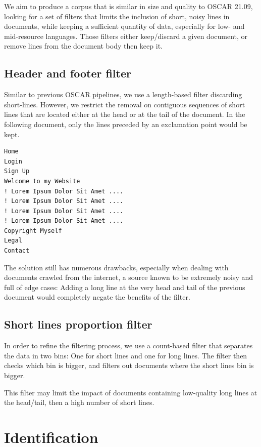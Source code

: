 We aim to produce a corpus that is similar in size and quality to OSCAR 21.09, looking for a set of filters that limits the inclusion of short, noisy lines in documents, while keeping a sufficient quantity of data, especially for low- and mid-resource languages. Those filters either keep/discard a given document, or remove lines from the document body then keep it.

\subsection {Header and footer filter}

Similar to previous OSCAR pipelines, we use a length-based filter discarding short-lines. However, we restrict the removal on contiguous sequences of short lines that are located either at the head or at the tail of the document. In the following document, only the lines preceded by an exclamation point would be kept.

\begin{verbatim}
Home
Login
Sign Up
Welcome to my Website
! Lorem Ipsum Dolor Sit Amet ....
! Lorem Ipsum Dolor Sit Amet ....
! Lorem Ipsum Dolor Sit Amet ....
! Lorem Ipsum Dolor Sit Amet ....
Copyright Myself
Legal
Contact
\end{verbatim}

The solution still has numerous drawbacks, especially when dealing with documents crawled from the internet, a source known to be extremely noisy and full of edge cases: Adding a long line at the very head and tail of the previous document would completely negate the benefits of the filter.

\subsection{Short lines proportion filter}

In order to refine the filtering process, we use a count-based filter that separates the data in two bins: One for short lines and one for long lines. The filter then checks which bin is bigger, and filters out documents where the short lines bin is bigger.

This filter may limit the impact of documents containing low-quality long lines at the head/tail, then a high number of short lines.


\section{Identification}

